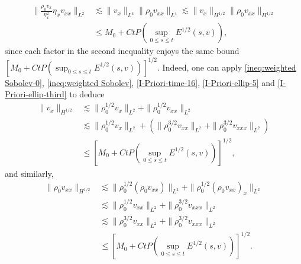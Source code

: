 \documentclass[11pt, reqno]{amsart}
\numberwithin{equation}{section}
\begin{document}
\begin{equation*}
\begin{aligned}
\bigg\|\frac{\rho_0v_x}{\eta_x^2}\eta_{x}v_{xx}\bigg\|_{L^2}
&\lesssim \|v_x\|_{L^4}\|\rho_0v_{xx}\|_{L^4}\lesssim \|v_x\|_{H^{1/2}}\|\rho_0v_{xx}\|_{H^{1/2}}\\
&\leq M_0+Ct P(\sup_{0\leq s\leq t}E^{1/2}(s,v)),
\end{aligned}
\end{equation*}
since each factor in the second inequality enjoys the same bound \([M_0+Ct P(\sup_{0\leq s\leq t}E^{1/2}(s,v))]^{1/2}\). Indeed, one can apply \eqref{ineq:weighted Sobolev-0}, \eqref{ineq:weighted Sobolev}, \eqref{I-Priori-time-16}, \eqref{I-Priori-ellip-5} and \eqref{I-Priori-ellip-third} to deduce
\begin{equation*}
\begin{aligned}
\|v_x\|_{H^{1/2}}&\lesssim \|\rho_0^{1/2}v_x\|_{L^2}+\|\rho_0^{1/2}v_{xx}\|_{L^2}\\
&\lesssim \|\rho_0^{1/2}v_x\|_{L^2}+(\|\rho_0^{3/2}v_{xx}\|_{L^2}+\|\rho_0^{3/2}v_{xxx}\|_{L^2})\\
&\leq [M_0+Ct P(\sup_{0\leq s\leq t}E^{1/2}(s,v))]^{1/2},
\end{aligned}
\end{equation*}
and similarly,
\begin{equation*}
\begin{aligned}
\|\rho_0v_{xx}\|_{H^{1/2}}&\lesssim \|\rho_0^{1/2}(\rho_0v_{xx})\|_{L^2}+\|\rho_0^{1/2}(\rho_0v_{xx})_x\|_{L^2}\\
&\lesssim \|\rho_0^{1/2}v_{xx}\|_{L^2}+\|\rho_0^{3/2}v_{xxx}\|_{L^2}\\
&\lesssim \|\rho_0^{3/2}v_{xx}\|_{L^2}+\|\rho_0^{3/2}v_{xxx}\|_{L^2}\\
&\leq [M_0+Ct P(\sup_{0\leq s\leq t}E^{1/2}(s,v))]^{1/2}.
\end{aligned}
\end{equation*}
\end{document}
